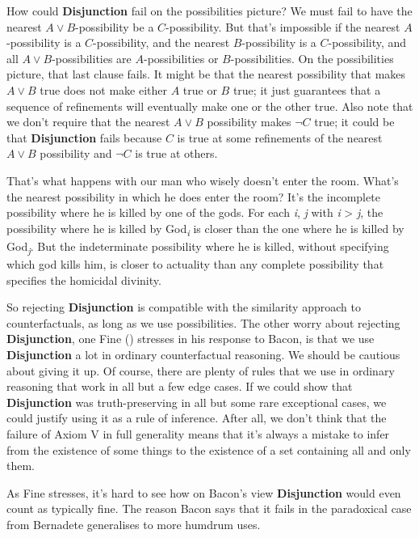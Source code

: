 \documentclass[
  11pt,
  letterpaper,
  DIV=11,
  numbers=noendperiod,
  twoside]{scrartcl}
\begin{document}
How could \textbf{Disjunction} fail on the possibilities picture? We
must fail to have the nearest \(A \vee B\)-possibility be a
\(C\)-possibility. But that's impossible if the nearest
\(A\)-possibility is a \(C\)-possibility, and the nearest
\(B\)-possibility is a \(C\)-possibility, and all
\(A \vee B\)-possibilities are \(A\)-possibilities or
\(B\)-possibilities. On the possibilities picture, that last clause
fails. It might be that the nearest possibility that makes \(A \vee B\)
true does not make either \(A\) true or \(B\) true; it just guarantees
that a sequence of refinements will eventually make one or the other
true. Also note that we don't require that the nearest \(A \vee B\)
possibility makes \(\neg C\) true; it could be that \textbf{Disjunction}
fails because \(C\) is true at some refinements of the nearest
\(A \vee B\) possibility and \(\neg C\) is true at others.

That's what happens with our man who wisely doesn't enter the room.
What's the nearest possibility in which he does enter the room? It's the
incomplete possibility where he is killed by one of the gods. For each
\emph{i}, \emph{j} with \emph{i} \textgreater{} \emph{j}, the
possibility where he is killed by God\textsubscript{\emph{i}} is closer
than the one where he is killed by God\textsubscript{\emph{j}}. But the
indeterminate possibility where he is killed, without specifying which
god kills him, is closer to actuality than any complete possibility that
specifies the homicidal divinity.

So rejecting \textbf{Disjunction} is compatible with the similarity
approach to counterfactuals, as long as we use possibilities. The other
worry about rejecting \textbf{Disjunction}, one Fine
() stresses in his response to Bacon, is
that we use \textbf{Disjunction} a lot in ordinary counterfactual
reasoning. We should be cautious about giving it up. Of course, there
are plenty of rules that we use in ordinary reasoning that work in all
but a few edge cases. If we could show that \textbf{Disjunction} was
truth-preserving in all but some rare exceptional cases, we could
justify using it as a rule of inference. After all, we don't think that
the failure of Axiom V in full generality means that it's always a
mistake to infer from the existence of some things to the existence of a
set containing all and only them.

As Fine stresses, it's hard to see how on Bacon's view
\textbf{Disjunction} would even count as typically fine. The reason
Bacon says that it fails in the paradoxical case from Bernadete
generalises to more humdrum uses.
\end{document}
